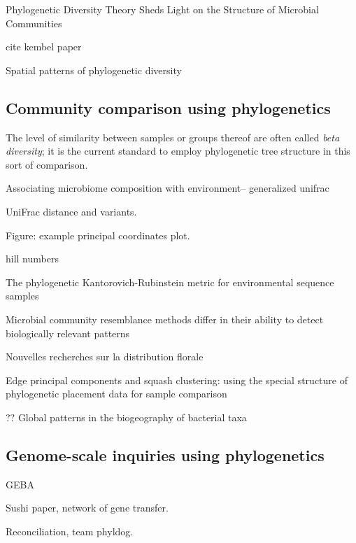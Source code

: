 \documentclass{amsart}
\begin{document}
\cite{odwyer2012phylogenetic}
Phylogenetic Diversity Theory Sheds Light on the Structure of Microbial Communities

cite kembel paper

\cite{morlon2011spatial}
Spatial patterns of phylogenetic diversity


\subsection{Community comparison using phylogenetics}

The level of similarity between samples or groups thereof are often called \emph{beta diversity}; it is the current standard to employ phylogenetic tree structure in this sort of comparison.

\cite{chen2012associating}
Associating microbiome composition with environment-- generalized unifrac

UniFrac distance and variants.
\cite{LozuponeKnightUniFrac05}
\cite{LozuponeEaWeightedUnifrac07}

Figure: example principal coordinates plot.

\cite{BikEaMicrobiotaStomach06}

hill numbers
\cite{chao2010phylogenetic}

\cite{evans2012phylogenetic}
The phylogenetic Kantorovich-Rubinstein metric for environmental sequence samples

\cite{kuczynski2010microbial}
Microbial community resemblance methods differ in their ability to detect biologically relevant patterns


\cite{jaccard1908nouvelles}
Nouvelles recherches sur la distribution florale


\cite{matsen2013edge}
Edge principal components and squash clustering: using the special structure of phylogenetic placement data for sample comparison

\cite{PurdomAnalyzingDataGraphs08}


\cite{nemergut2011global}
?? Global patterns in the biogeography of bacterial taxa


\subsection{Genome-scale inquiries using phylogenetics}

GEBA \cite{wu2009phylogeny}

Sushi paper, network of gene transfer.

Reconciliation, team phyldog.
\end{document}
